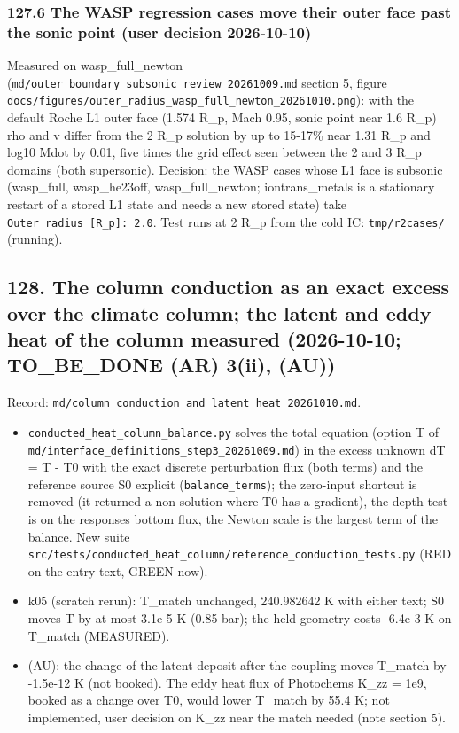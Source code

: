 \documentclass[english,a4paper]{my_memo}
\providecommand{\tightlist}{\setlength{\itemsep}{0pt}\setlength{\parskip}{0pt}}
\begin{document}
\subsubsection{127.6 The WASP regression cases move their outer face past the sonic point (user decision 2026-10-10)}\label{1276-the-wasp-regression-cases-move-their-outer-face-past-the-sonic-point-user-decision-2026-10-10}

Measured on wasp\_full\_newton (\texttt{md/outer\_boundary\_subsonic\_review\_20261009.md}
section 5, figure \texttt{docs/figures/outer\_radius\_wasp\_full\_newton\_20261010.png}):
with the default Roche L1 outer face (1.574 R\_p, Mach 0.95, sonic point near
1.6 R\_p) rho and v differ from the 2 R\_p solution by up to 15-17\% near 1.31 R\_p
and log10 Mdot by 0.01, five times the grid effect seen between the 2 and 3 R\_p
domains (both supersonic). Decision: the WASP cases whose L1 face is subsonic
(wasp\_full, wasp\_he23off, wasp\_full\_newton; iontrans\_metals is a stationary
restart of a stored L1 state and needs a new stored state) take
\texttt{Outer\ radius\ {[}R\_p{]}:\ 2.0}. Test runs at 2 R\_p from the cold IC: \texttt{tmp/r2cases/}
(running).

\subsection{128. The column conduction as an exact excess over the climate column; the latent and eddy heat of the column measured (2026-10-10; TO\_BE\_DONE (AR) 3(ii), (AU))}\label{128-the-column-conduction-as-an-exact-excess-over-the-climate-column-the-latent-and-eddy-heat-of-the-column-measured-2026-10-10-to_be_done-ar-3ii-au}

Record: \texttt{md/column\_conduction\_and\_latent\_heat\_20261010.md}.

\begin{itemize}
\tightlist
\item
  \texttt{conducted\_heat\_column\_balance.py} solves the total equation (option T of \texttt{md/interface\_definitions\_step3\_20261009.md}) in the excess unknown dT = T - T0 with the exact discrete perturbation flux (both terms) and the reference source S0 explicit (\texttt{balance\_terms}); the zero-input shortcut is removed (it returned a non-solution where T0 has a gradient), the depth test is on the response\textquotesingle s bottom flux, the Newton scale is the largest term of the balance. New suite \texttt{src/tests/conducted\_heat\_column/reference\_conduction\_tests.py} (RED on the entry text, GREEN now).
\item
  k05 (scratch rerun): T\_match unchanged, 240.982642 K with either text; S0 moves T by at most 3.1e-5 K (0.85 bar); the held geometry costs -6.4e-3 K on T\_match (MEASURED).
\item
  (AU): the change of the latent deposit after the coupling moves T\_match by -1.5e-12 K (not booked). The eddy heat flux of Photochem\textquotesingle s K\_zz = 1e9, booked as a change over T0, would lower T\_match by 55.4 K; not implemented, user decision on K\_zz near the match needed (note section 5).
\end{itemize}
\end{document}
